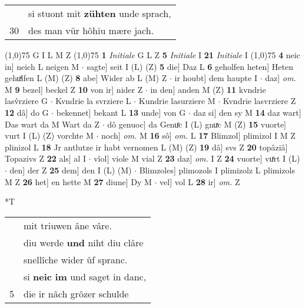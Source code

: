 \documentclass[8pt,a4paper,notitlepage]{article}
\begin{document}
\begin{table}[ht]
\begin{minipage}[t]{0.5\linewidth}
\begin{tabular}{rl}
 & si stuont mit \textbf{zühten} unde sprach,\\ 
30 & des man vür hôhiu mære jach.\\ 
\end{tabular}
\scriptsize
\line(1,0){75} \newline
G I L M Z \newline
\line(1,0){75} \newline
\textbf{1} \textit{Initiale} G L Z  \textbf{5} \textit{Initiale} I  \textbf{21} \textit{Initiale} I  \newline
\line(1,0){75} \newline
\textbf{4} neic in] neich L neigen M  $\cdot$ sagte] seit I (L) (Z) \textbf{5} die] Daz L \textbf{6} geholfen heten] Heten gehuͯlfen L (M) (Z) \textbf{8} abe] Wider ab L (M) Z  $\cdot$ ir houbt] dem haupte I  $\cdot$ daz] \textit{om.} M \textbf{9} bezel] beckel Z \textbf{10} von ir] nider Z  $\cdot$ in den] anden M (Z) \textbf{11} kvndrie lasv̂rziere G  $\cdot$ Kvndrie la svrziere L  $\cdot$ Kundrie lasurziere M  $\cdot$ Kvndrie lasvrziere Z \textbf{12} dâ] do G  $\cdot$ bekennet] bekant L \textbf{13} unde] von G  $\cdot$ daz si] den sy M \textbf{14} daz wart] Das wart da M Wart da Z  $\cdot$ dô genuoc] da Genuͤc I (L) gnuͯc M (Z) \textbf{15} vuorte] vurt I (L) (Z) vorchte M  $\cdot$ noch] \textit{om.} M \textbf{16} sô] \textit{om.} L \textbf{17} Blimzol] plimizol I M Z plinizol L \textbf{18} Jr antlutze ir habt vernomen L (M) (Z) \textbf{19} dâ] svs Z \textbf{20} topâziâ] Topazivs Z \textbf{22} als] al I  $\cdot$ vîol] viole M vial Z \textbf{23} daz] \textit{om.} I Z \textbf{24} vuorte] vuͤrt I (L)  $\cdot$ den] der Z \textbf{25} dem] den I (L) (M)  $\cdot$ Blimzoles] plimozols I plimizolz L plimizols M Z \textbf{26} het] en hette M \textbf{27} diune] Dy M  $\cdot$ vel] vol L \textbf{28} ir] \textit{om.} Z \newline
\end{minipage}
\hspace{0.5cm}
\begin{minipage}[t]{0.5\linewidth}
\small
\begin{center}*T
\end{center}
\begin{tabular}{rl}
 & mit triuwen âne vâre.\\ 
 & diu werde \textbf{und} niht diu clâre\\ 
 & snellîche wider ûf spranc.\\ 
 & si \textbf{neic} \textbf{im} und saget in danc,\\ 
5 & die ir nâch grôzer schulde\\ 

\end{tabular}
\end{minipage}
\end{table}
\end{document}
